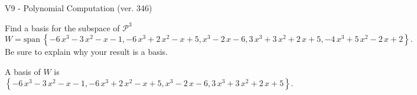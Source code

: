 \begin{exercise}
  \begin{exerciseTitle}V9 - Polynomial Computation (ver. 346)\end{exerciseTitle}
  \begin{exerciseStatement}
    Find a basis for the subspace of \(\mathcal{P}^3\) 
\[W=\mathrm{span}\ \left\{-6 \, x^{3} - 3 \, x^{2} - x - 1 , -6 \, x^{3} + 2 \, x^{2} - x + 5 , x^{3} - 2 \, x - 6 , 3 \, x^{3} + 3 \, x^{2} + 2 \, x + 5 , -4 \, x^{3} + 5 \, x^{2} - 2 \, x + 2\right\}.\]
 Be sure to explain why your result is a basis.


  \end{exerciseStatement}
  \begin{exerciseAnswer}
   A basis of \(W\) is  \(\left\{-6 \, x^{3} - 3 \, x^{2} - x - 1 , -6 \, x^{3} + 2 \, x^{2} - x + 5 , x^{3} - 2 \, x - 6 , 3 \, x^{3} + 3 \, x^{2} + 2 \, x + 5\right\}\).
  


  \end{exerciseAnswer}
\end{exercise}